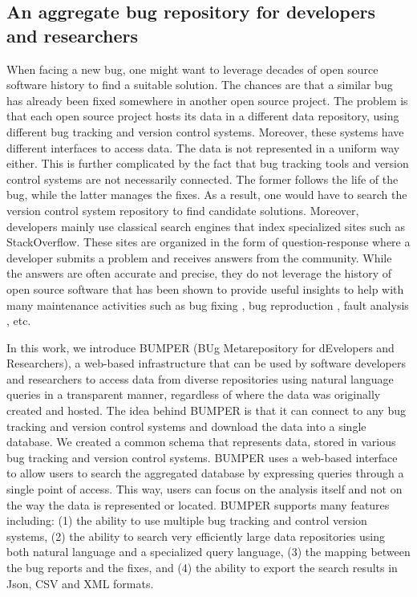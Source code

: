\subsection{An aggregate bug  repository for  developers  and  researchers}
When facing a new bug, one might want to leverage decades of open source software history to find a suitable solution.
The chances are that a similar bug has already been fixed somewhere  in  another  open  source  project.
The  problem  is that each open source project hosts its data in a different data repository,  using  different  bug  tracking  and  version  control systems. Moreover,  these  systems  have  different  interfaces to  access  data.
The  data  is  not  represented  in  a  uniform way  either. This  is  further  complicated  by  the  fact  that  bug tracking tools and version control systems are not necessarily connected. The  former  follows  the  life  of  the  bug,  while  the latter  manages  the  fixes. As  a  result,  one  would  have  to search the version control system repository to find candidate solutions. Moreover,  developers  mainly  use  classical  search  engines that  index  specialized  sites  such  as  StackOverflow. These sites  are  organized  in  the  form  of  question-response  where a developer submits a problem and receives answers from the community. While the answers are often accurate and precise, they do not leverage the history of open source software that has been shown to provide useful insights to help with many maintenance activities such as bug fixing \cite{Saha2014}, bug reproduction \cite{Nayrolles2015}, fault analysis \cite{Nessa2008}, etc.

In this work, we introduce BUMPER (BUg Metarepository for  dEvelopers  and  Researchers),  a  web-based  infrastructure
that  can  be  used  by  software  developers  and  researchers  to access  data  from  diverse  repositories  using  natural  language queries in a transparent manner, regardless of where the data was originally created and hosted.
The  idea  behind  BUMPER  is  that  it  can  connect  to  any bug  tracking  and  version  control  systems  and  download  the data  into  a  single  database. We  created  a  common  schema that represents data, stored in various bug tracking and version control systems. BUMPER uses a web-based interface to allow users to search the aggregated database by expressing queries through a single point of access. This way, users can focus on the analysis itself and not on the way the data is represented or located.
BUMPER supports many features including: (1) the ability to use multiple bug tracking and control version systems, (2) the  ability  to  search  very  efficiently  large  data  repositories using both natural language and a specialized query language, (3)  the  mapping  between  the  bug  reports  and  the  fixes,  and (4)  the  ability  to  export  the  search  results  in  Json,  CSV  and XML formats.

